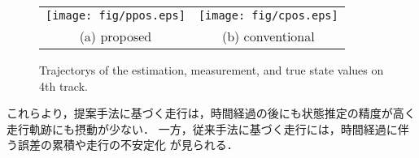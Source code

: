 \documentclass[a4paper,10pt,twocolumn,fleqn]{jsarticle}
\begin{document}
\begin{figure}[btp]
\begin{center}
\begin{tabular}{cc}
 \texttt{[image: fig/ppos.eps]}&
 \texttt{[image: fig/cpos.eps]}\\
(a) proposed &
(b) conventional
\end{tabular}
\end{center}
 \caption{Trajectorys of the estimation, measurement, and
 true state values on 4th track.}
 \label{fig:track2}
\end{figure}
これらより，提案手法に基づく走行は，時間経過の後にも状態推定の精度が高く
走行軌跡にも摂動が少ない．
一方，従来手法に基づく走行には，時間経過に伴う誤差の累積や走行の不安定化
が見られる．
%
%
\vspace{-4mm}
\end{document}
